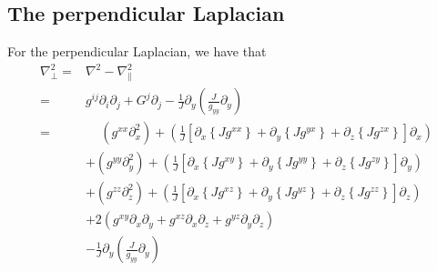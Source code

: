 \documentclass[12pt]{article}
\def\L{\left}
\def\R{\right}
\newcommand{\Grad}{\ensuremath{\nabla}}
\begin{document}
\subsection{The perpendicular Laplacian}
For the perpendicular Laplacian, we have that
%
\begin{align*}
    \Grad_\perp^2 =& \Grad^2 - \Grad_\|^2\\
                  =& g^{ij} \partial_i \partial_j + G^j \partial_j
                    -\frac{1}{J} \partial_y \L(\frac{J}{g_{yy}} \partial_y\R)\\
%
            =& \quad \,
               \L(g^{xx} \partial_x^2\R)
               + \L(
                    \frac{1}{J} \L[
                      \partial_x \L\{J g^{xx} \R\}
                    + \partial_y \L\{J g^{yx} \R\}
                    + \partial_z \L\{J g^{zx} \R\}
                    \R]
                    \partial_x\R)\\
            &+ \L(g^{yy} \partial_y^2\R)
               + \L(
                    \frac{1}{J} \L[
                      \partial_x \L\{J g^{xy} \R\}
                    + \partial_y \L\{J g^{yy} \R\}
                    + \partial_z \L\{J g^{zy} \R\}
                    \R]
                    \partial_y\R)\\
            &+ \L(g^{zz} \partial_z^2\R)
               + \L(
                    \frac{1}{J} \L[
                      \partial_x \L\{J g^{xz} \R\}
                    + \partial_y \L\{J g^{yz} \R\}
                    + \partial_z \L\{J g^{zz} \R\}
                    \R]
                    \partial_z\R)\\
            &+ 2\L( g^{xy} \partial_x \partial_y
                  + g^{xz} \partial_x \partial_z
                  + g^{yz} \partial_y \partial_z
                  \R)\\
            &- \frac{1}{J} \partial_y \L(\frac{J}{g_{yy}} \partial_y\R)
\end{align*}
%
\end{document}
